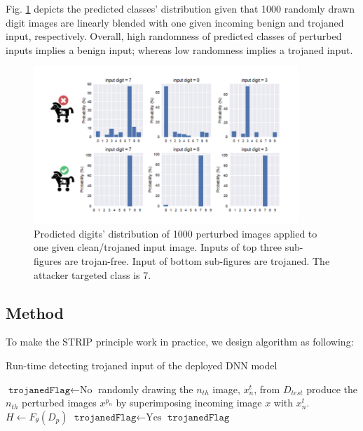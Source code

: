 \documentclass[letterpaper]{article}
\begin{document}
Fig. \ref{fig:strip_4} depicts the predicted classes' distribution given that 1000 randomly drawn digit images are linearly blended with one given incoming benign and trojaned input, respectively. Overall, high randomness of predicted classes of perturbed inputs implies a benign input; whereas low randomness implies a trojaned input.

\begin{figure}[H]
    \centering
    \includegraphics[width=10cm]{img/strip_4.png}
    \caption{Prodicted digits' distribution of 1000 perturbed images applied to one given clean/trojaned input image. Inputs of top three sub-figures are trojan-free. Input of bottom sub-figures are trojaned. The attacker targeted class is 7.}
    \label{fig:strip_4}
\end{figure}

\subsection*{Method}
To make the STRIP principle work in practice, we design algorithm as following: 

\begin{algorithm}
  \caption{Run-time detecting trojaned input of the deployed DNN model}
  \begin{algorithmic}
        \State $\texttt{trojanedFlag} \leftarrow \text{No}$
            \State randomly drawing the $n_{th}$ image, $x_n^t$, from $D_{test}$
            \State produce the $n_{th}$ perturbed images $x^{p_n}$ by superimposing incoming image $x$ with $x_n^t$.
        \EndFor
        \State $H \leftarrow F_\theta (D_p)$
            \State $\texttt{trojanedFlag} \leftarrow \text{Yes}$
        \EndIf 
        \State \Return $\texttt{trojanedFlag}$
    \EndFunction
  \end{algorithmic}
\end{algorithm}
\end{document}
